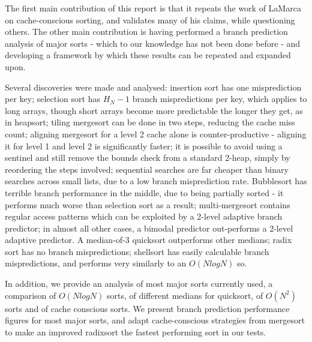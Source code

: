 The first main contribution of this report is that it repeats the work of LaMarca
on cache-conscious sorting, and validates many of his claims, while questioning
others. The other main contribution is having performed a branch prediction
analysis of major sorts - which to our knowledge has not been done before - and
developing a framework by which these results can be repeated and expanded upon.

Several discoveries were made and analysed: insertion sort has one misprediction
per key; selection sort has $H_N-1$ branch mispredictions per key, which applies
to long arrays, though short arrays become more predictable the longer they
get, as in heapsort; tiling mergesort can be done in two steps, reducing the
cache miss count; aligning mergesort for a level 2 cache alone is
counter-productive - aligning it for level 1 and level 2 is significantly
faster; it is possible to avoid using a sentinel and still remove the bounds
check from a standard 2-heap, simply by reordering the steps involved;
sequential searches are far cheaper than binary searches across small lists, due
to a low branch misprediction rate. Bubblesort has terrible branch performance
in the middle, due to being partially sorted - it performs much worse than
selection sort as a result; multi-mergesort contains regular access patterns
which can be exploited by a 2-level adaptive branch predictor; in almost all
other cases, a bimodal predictor out-performs a 2-level adaptive predictor. A
median-of-3 quicksort outperforms other medians; radix sort has no branch
mispredictions; shellsort has easily calculable branch mispredictions, and
performs very similarly to an $O(NlogN)$ so.

In addition, we provide an analysis of most major sorts currently used, a
comparison of $O(NlogN)$ sorts, of different medians for quicksort, of $O(N^2)$
sorts and of cache conscious sorts. We present branch prediction performance
figures for most major sorts, and adapt cache-conscious strategies from
mergesort to make an improved radixsort the fastest performing sort in our
tests.
